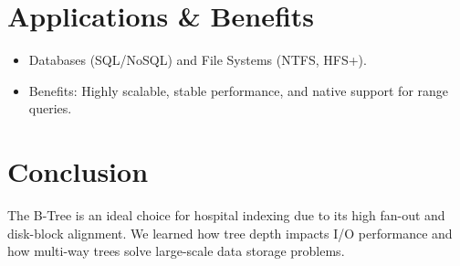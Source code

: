 \documentclass[11pt,a4paper]{article}
\begin{document}
\section{Applications \& Benefits}
\begin{itemize}[noitemsep]
    \item Databases (SQL/NoSQL) and File Systems (NTFS, HFS+).
    \item Benefits: Highly scalable, stable performance, and native support for range queries.
\end{itemize}

\section{Conclusion}
The B-Tree is an ideal choice for hospital indexing due to its high fan-out and disk-block alignment. We learned how tree depth impacts I/O performance and how multi-way trees solve large-scale data storage problems.
\end{document}

